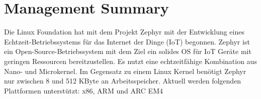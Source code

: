 \chapter{Management Summary}
\label{chap:managementsummary}

Die Linux Foundation hat mit dem Projekt Zephyr mit der Entwicklung eines
Echtzeit-Betriebssystems für das Internet der Dinge (IoT) begonnen.
Zephyr ist ein Open-Source-Betriebssystem mit dem Ziel ein solides OS für IoT Geräte
mit geringen Ressourcen bereitzustellen. Es nutzt eine echtzeitfähige Kombination aus
Nano- und Microkernel.
Im Gegensatz zu einem Linux Kernel benötigt Zephyr nur zwischen 8 und 512 KByte an
Arbeitsspeicher. Aktuell werden folgenden Plattformen unterstützt: x86, ARM und ARC
EM4